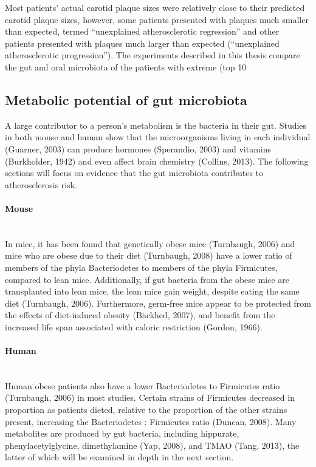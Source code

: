 Most patients’ actual carotid plaque sizes were relatively close to their predicted carotid plaque sizes, however, some patients presented with plaques much smaller than expected, termed “unexplained atherosclerotic regression” and other patients presented with plaques much larger than expected (“unexplained atherosclerotic progression”). The experiments described in this thesis compare the gut and oral microbiota of the patients with extreme (top 10%

\FloatBarrier

\subsection{Metabolic potential of gut microbiota}
A large contributor to a person’s metabolism is the bacteria in their gut. Studies in both mouse and human show that the microorganisms living in each individual (Guarner, 2003) can produce hormones (Sperandio, 2003) and vitamins (Burkholder, 1942) and even affect brain chemistry (Collins, 2013). The following sections will focus on evidence that the gut microbiota contributes to atherosclerosis risk.

\paragraph{Mouse}\mbox{}\\
In mice, it has been found that genetically obese mice (Turnbaugh, 2006) and mice who are obese due to their diet (Turnbaugh, 2008) have a lower ratio of members of the phyla Bacteriodetes to members of the phyla Firmicutes, compared to lean mice. Additionally, if gut bacteria from the obese mice are transplanted into lean mice, the lean mice gain weight, despite eating the same diet (Turnbaugh, 2006). Furthermore, germ-free mice appear to be protected from the effects of diet-induced obesity (Bäckhed, 2007), and benefit from the increased life span associated with caloric restriction (Gordon, 1966).

\paragraph{Human}\mbox{}\\
Human obese patients also have a lower Bacteriodetes to Firmicutes ratio (Turnbaugh, 2006) in most studies. Certain strains of Firmicutes decreased in proportion as patients dieted, relative to the proportion of the other strains present, increasing the Bacteriodetes : Firmicutes ratio (Duncan, 2008). Many metabolites are produced by gut bacteria, including hippurate, phenylacetylglycine, dimethylamine (Yap, 2008), and TMAO (Tang, 2013), the latter of which will be examined in depth in the next section.

